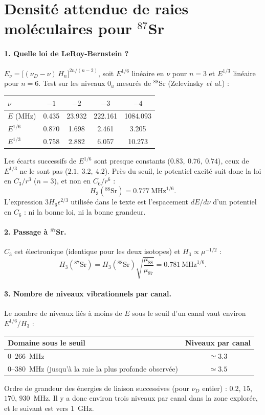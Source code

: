 \documentclass[11pt]{article}
\begin{document}
\section*{Densité attendue de raies moléculaires pour $^{87}$Sr}

\paragraph{1. Quelle loi de LeRoy-Bernstein ?}
$E_\nu = \big[(\nu_D-\nu)\,H_n\big]^{2n/(n-2)}$, soit $E^{1/6}$ linéaire en $\nu$ pour $n=3$ et $E^{1/3}$ linéaire pour $n=6$.
Test sur les niveaux $0_u$ mesurés de $^{88}$Sr (Zelevinsky \emph{et al.}) :
\begin{center}
\begin{tabular}{lcccc}\toprule
$\nu$ & $-1$ & $-2$ & $-3$ & $-4$\\ \midrule
$E$ (MHz) & 0.435 & 23.932 & 222.161 & 1084.093\\
$E^{1/6}$ & 0.870 & 1.698 & 2.461 & 3.205 \\
$E^{1/3}$ & 0.758 & 2.882 & 6.057 & 10.273\\ \bottomrule
\end{tabular}
\end{center}
Les écarts successifs de $E^{1/6}$ sont presque constants ($0.83,\ 0.76,\ 0.74$), ceux de $E^{1/3}$ ne le sont pas ($2.1,\ 3.2,\ 4.2$).
Près du seuil, le potentiel excité suit donc la loi en $C_3/r^3$ ($n=3$), et non en $C_6/r^6$ :
\[
H_3(^{88}\text{Sr}) = 0.777~\text{MHz}^{1/6}.
\]
L'expression $3H_6\epsilon^{2/3}$ utilisée dans le texte est l'espacement $dE/d\nu$ d'un potentiel en $C_6$ : ni la bonne loi, ni la bonne grandeur.

\paragraph{2. Passage à $^{87}$Sr.} $C_3$ est électronique (identique pour les deux isotopes) et $H_3\propto\mu^{-1/2}$ :
\[
H_3(^{87}\text{Sr}) = H_3(^{88}\text{Sr})\sqrt{\frac{\mu_{88}}{\mu_{87}}} = 0.781~\text{MHz}^{1/6}.
\]

\paragraph{3. Nombre de niveaux vibrationnels par canal.}
Le nombre de niveaux liés à moins de $E$ sous le seuil d'un canal vaut environ $E^{1/6}/H_3$ :
\begin{center}
\begin{tabular}{lc}\toprule
Domaine sous le seuil & Niveaux par canal \\ \midrule
$0$--$266$~MHz & $\simeq 3.3$\\
$0$--$380$~MHz (jusqu'à la raie la plus profonde observée) & $\simeq 3.5$\\ \bottomrule
\end{tabular}
\end{center}
Ordre de grandeur des énergies de liaison successives (pour $\nu_D$ entier) : $0.2$, $15$, $170$, $930$~MHz. Il y a donc environ trois niveaux par canal dans la zone explorée, et le suivant est vers $1$~GHz.
\end{document}
